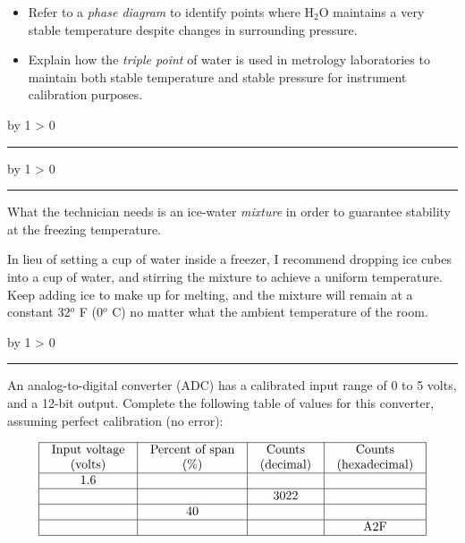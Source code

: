 \documentclass[12pt,a4paper]{article}
\def\oppgave{
            \advance\questnum by 1
            \ifnum \questnum > 0
                 \hrule
                 \vskip 3pt
                 \leftline{Oppgave \the\questnum}
                 \vskip 3pt \fi}
\def\svar{
           \advance\answnum by 1
           \ifnum \answnum > 0
                \hrule
                \vskip 3pt
                \leftline{Svar \the\answnum}
                \vskip 3pt \fi}
\def\notes{
           \advance\explnum by 1
           \ifnum \explnum > 0
                \hrule
                \vskip 3pt
                \leftline{Notes \the\explnum}
                \vskip 3pt \fi}
\begin{document}
\begin{itemize}
\item{} Refer to a {\it phase diagram} to identify points where H$_{2}$O maintains a very stable temperature despite changes in surrounding pressure. 
\item{} Explain how the {\it triple point} of water is used in metrology laboratories to maintain both stable temperature and stable pressure for instrument calibration purposes. 
\end{itemize}

\vskip 10pt \filbreak 





\svar{} 

\vskip 10pt \filbreak 





\notes{} 

What the technician needs is an ice-water {\it mixture} in order to guarantee stability at the freezing temperature.

\vskip 10pt

In lieu of setting a cup of water inside a freezer, I recommend dropping ice cubes into a cup of water, and stirring the mixture to achieve a uniform temperature.  Keep adding ice to make up for melting, and the mixture will remain at a constant 32$^{o}$ F (0$^{o}$ C) no matter what the ambient temperature of the room.


\vfil \eject 



\oppgave{} 

An analog-to-digital converter (ADC) has a calibrated input range of 0 to 5 volts, and a 12-bit output.  Complete the following table of values for this converter, assuming perfect calibration (no error):


$$\vbox{\offinterlineskip
\halign{\strut
\vrule \quad\hfil # \ \hfil & 
\vrule \quad\hfil # \ \hfil & 
\vrule \quad\hfil # \ \hfil & 
\vrule \quad\hfil # \ \hfil \vrule \cr
\noalign{\hrule}
%
Input voltage & Percent of span & Counts & Counts \cr
%
(volts) & (\%) & (decimal) & (hexadecimal) \cr
%
\noalign{\hrule}
%
1.6 &  &  & \cr
%
\noalign{\hrule}
%
 &  & 3022 & \cr
%
\noalign{\hrule}
%
 & 40 &  & \cr
%
\noalign{\hrule}
%
 &  &  & A2F \cr
%
\noalign{\hrule}
} %
}$$ %
\end{document}
